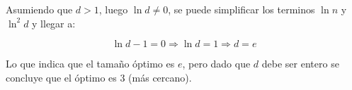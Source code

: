 \documentclass[dcc,sol]{fcfmcourse}
\begin{document}
\begin{problems}
\begin{solution}
\begin{itemize}
Asumiendo que $d>1$, luego $\ln{d} \neq 0$, se puede simplificar los terminos $\ln{n}$ y $\ln^2{d}$ y llegar a:

\begin{equation*}
    \ln{d}-1=0 \Rightarrow \ln{d} = 1 \Rightarrow d = e
\end{equation*}

Lo que indica que el tamaño óptimo es $e$, pero dado que $d$ debe ser entero se concluye que el óptimo es 3 (más cercano).

\end{itemize}



\end{solution}


\end{problems}
\end{document}

